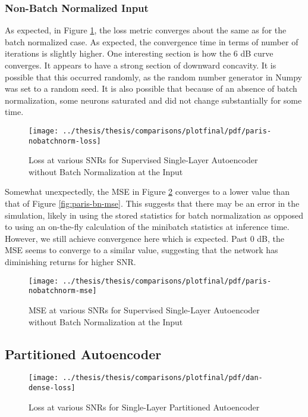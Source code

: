 \subsubsection{Non-Batch Normalized Input}

As expected, in Figure \ref{fig:paris-loss}, the loss metric converges about the same as for the batch normalized case. As expected, the convergence time in terms of number of iterations is slightly higher. One interesting section is how the 6 dB curve converges. It appears to have a strong section of downward concavity. It is possible that this occurred randomly, as the random number generator in Numpy was set to a random seed. It is also possible that because of an absence of batch normalization, some neurons saturated and did not change substantially for some time.

\begin{figure}[!ht]
\centering
\texttt{[image: ../thesis/thesis/comparisons/plotfinal/pdf/paris-nobatchnorm-loss]}
\caption{Loss at various SNRs for Supervised Single-Layer Autoencoder without Batch Normalization at the Input}\label{fig:paris-loss}
\end{figure}

Somewhat unexpectedly, the MSE in Figure \ref{fig:paris-mse} converges to a lower value than that of Figure \ref{fig:paris-bn-mse}. This suggests that there may be an error in the simulation, likely in using the stored statistics for batch normalization as opposed to using an on-the-fly calculation of the minibatch statistics at inference time. However, we still achieve convergence here which is expected. Past 0 dB, the MSE seems to converge to a similar value, suggesting that the network has diminishing returns for higher SNR.

\begin{figure}[!ht]
\centering
\texttt{[image: ../thesis/thesis/comparisons/plotfinal/pdf/paris-nobatchnorm-mse]}
\caption{MSE at various SNRs for Supervised Single-Layer Autoencoder without Batch Normalization at the Input}\label{fig:paris-mse}
\end{figure}


\subsection{Partitioned Autoencoder}



\begin{figure}[!ht]
\centering
\texttt{[image: ../thesis/thesis/comparisons/plotfinal/pdf/dan-dense-loss]}
\caption{Loss at various SNRs for Single-Layer Partitioned Autoencoder\cite{stow}}
\label{fig:dan-loss}
\end{figure}

